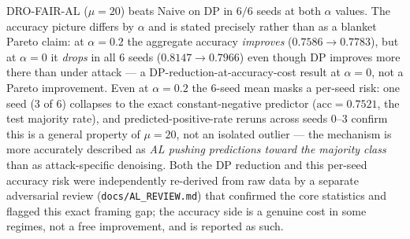 DRO-FAIR-AL ($\mu{=}20$) beats Naive on DP in $6/6$ seeds at both $\alpha$
values. The accuracy picture differs by $\alpha$ and is stated precisely
rather than as a blanket Pareto claim: at $\alpha{=}0.2$ the aggregate
accuracy \emph{improves} ($0.7586\to0.7783$), but at $\alpha{=}0$ it
\emph{drops} in all 6 seeds ($0.8147\to0.7966$) even though DP improves
more there than under attack --- a DP-reduction-at-accuracy-cost result at
$\alpha{=}0$, not a Pareto improvement. Even at $\alpha{=}0.2$ the 6-seed
mean masks a per-seed risk: one seed (3 of 6) collapses to the exact
constant-negative predictor ($\mathrm{acc}{=}0.7521$, the test majority
rate), and predicted-positive-rate reruns across seeds 0--3 confirm this is
a general property of $\mu{=}20$, not an isolated outlier --- the mechanism
is more accurately described as \emph{AL pushing predictions toward the
majority class} than as attack-specific denoising. Both the DP reduction and
this per-seed accuracy risk were independently re-derived from raw data by a
separate adversarial review (\texttt{docs/AL\_REVIEW.md}) that confirmed the
core statistics and flagged this exact framing gap; the accuracy side is a
genuine cost in some regimes, not a free improvement, and is reported as
such.

